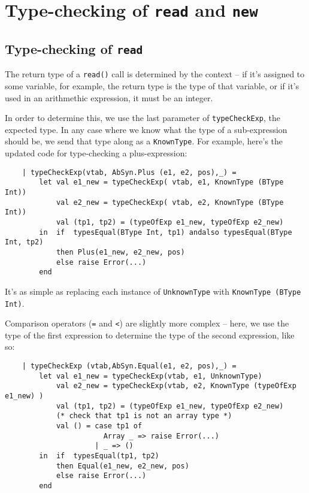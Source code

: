\documentclass{article}
\begin{document}
\section{Type-checking of \texttt{read} and \texttt{new}}

\subsection{Type-checking of \texttt{read}}
The return type of a \texttt{read()} call is determined by the context -- if it's assigned to some variable, for example, the return type is the type of that variable, or if it's used in an arithmethic expression, it must be an integer.

In order to determine this, we use the last parameter of \texttt{typeCheckExp}, the expected type. In any case where we know what the type of a sub-expression should be, we send that type along as a \texttt{KnownType}. For example, here's the updated code for type-checking a plus-expression:

\begin{lstlisting}
    | typeCheckExp(vtab, AbSyn.Plus (e1, e2, pos),_) =
        let val e1_new = typeCheckExp( vtab, e1, KnownType (BType Int))
            val e2_new = typeCheckExp( vtab, e2, KnownType (BType Int))
            val (tp1, tp2) = (typeOfExp e1_new, typeOfExp e2_new)
        in  if  typesEqual(BType Int, tp1) andalso typesEqual(BType Int, tp2)
            then Plus(e1_new, e2_new, pos)
            else raise Error(...)
        end
\end{lstlisting}

It's as simple as replacing each instance of \texttt{UnknownType} with \texttt{KnownType (BType Int)}.

Comparison operators (\texttt{=} and \texttt{<}) are slightly more complex -- here, we use the type of the first expression to determine the type of the second expression, like so:

\begin{lstlisting}
    | typeCheckExp (vtab,AbSyn.Equal(e1, e2, pos),_) =
        let val e1_new = typeCheckExp(vtab, e1, UnknownType)
            val e2_new = typeCheckExp(vtab, e2, KnownType (typeOfExp e1_new) )
            val (tp1, tp2) = (typeOfExp e1_new, typeOfExp e2_new)
            (* check that tp1 is not an array type *)
            val () = case tp1 of
                       Array _ => raise Error(...)
                     | _ => ()
        in  if  typesEqual(tp1, tp2)
            then Equal(e1_new, e2_new, pos)
            else raise Error(...)
        end
\end{lstlisting}
\end{document}
